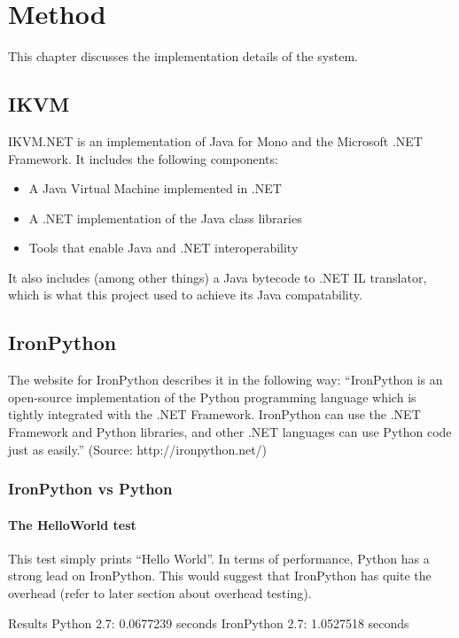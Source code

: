 \chapter{Method}
This chapter discusses the implementation details of the system.

\section{IKVM}
IKVM.NET is an implementation of Java for Mono and the Microsoft .NET Framework. It includes the following components:

\begin{itemize}
	\item A Java Virtual Machine implemented in .NET
	\item A .NET implementation of the Java class libraries
	\item Tools that enable Java and .NET interoperability
\end{itemize}

It also includes (among other things) a Java bytecode to .NET IL translator, which is what this project used to achieve its Java compatability.


\section{IronPython}
The website for IronPython describes it in the following way: ``IronPython is an open-source implementation of the Python programming language which is tightly integrated with the .NET Framework. IronPython can use the .NET Framework and Python libraries, and other .NET languages can use Python code just as easily.'' (Source: http://ironpython.net/)

\subsection{IronPython vs Python}

\subsubsection{The HelloWorld test}
This test simply prints ``Hello World''. In terms of performance, Python has a strong lead on IronPython. This would suggest that IronPython has quite the overhead (refer to later section about overhead testing).

Results
Python 2.7: 0.0677239 seconds
IronPython 2.7: 1.0527518 seconds

